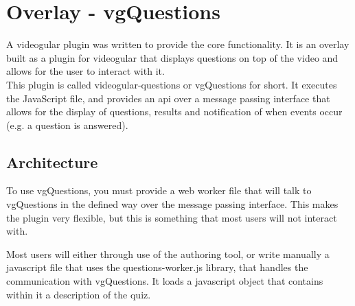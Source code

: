 \chapter{Overlay - vgQuestions} \label{Chapter:Overlay}

\begin{preamble}
A videogular plugin was written to provide the core functionality. It is an overlay built as a plugin for videogular that displays questions on top of the video and allows for the user to interact with it. \\ This plugin is called videogular-questions or vgQuestions for short. It executes the JavaScript file, and provides an api over a message passing interface that allows for the display of questions, results and notification of when events occur (e.g. a question is answered).
\end{preamble}

\section{Architecture}
\label{Section:Architecture}

To use vgQuestions, you must provide a web worker file that will talk to
vgQuestions in the defined way over the message passing interface. This makes
the plugin very flexible, but this is something that most users will not
interact with.

Most users will either through use of the authoring tool, or write manually a
javascript file that uses the questions-worker.js library, that handles the
communication with vgQuestions. It loads a javascript object that contains
within it a description of the quiz.

